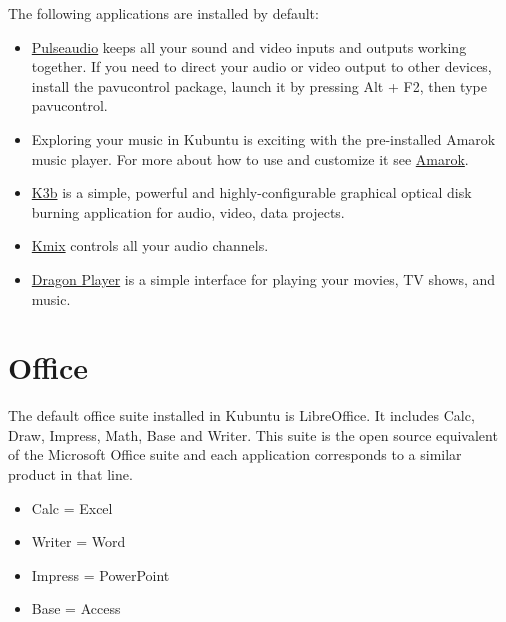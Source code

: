\documentclass[letterpaper,10pt,english]{sphinxmanual}
\begin{document}
The following applications are installed by default:
\begin{itemize}
\item {} 
\href{https://wiki.ubuntu.com/PulseAudio}{Pulseaudio} keeps all your sound and video inputs and outputs working together. If you need to direct your audio or video output to other devices, install the pavucontrol package, launch it by pressing Alt + F2, then type pavucontrol.

\item {} 
Exploring your music in Kubuntu is exciting with the pre-installed Amarok music player. For more about how to use and customize it see \href{https://userbase.kde.org/Special:MyLanguage/Amarok}{Amarok}.

\item {} 
\href{https://userbase.kde.org/Special:MyLanguage/K3b}{K3b} is a simple, powerful and highly-configurable graphical optical disk burning application for audio, video, data projects.

\item {} 
\href{https://userbase.kde.org/Special:MyLanguage/KMix}{Kmix} controls all your audio channels.

\item {} 
\href{https://userbase.kde.org/Special:MyLanguage/Dragon\_Player}{Dragon Player} is a simple interface for playing your movies, TV shows, and music.

\end{itemize}


\section{Office}
\label{\detokenize{docs/software:office}}
The default office suite installed in Kubuntu is LibreOffice. It includes Calc, Draw, Impress, Math, Base and Writer. This suite is the open source equivalent of the Microsoft Office suite and each application corresponds to a similar product in that line.
\begin{itemize}
\item {} 
Calc = Excel

\item {} 
Writer = Word

\item {} 
Impress = PowerPoint

\item {} 
Base = Access

\end{itemize}
\end{document}
